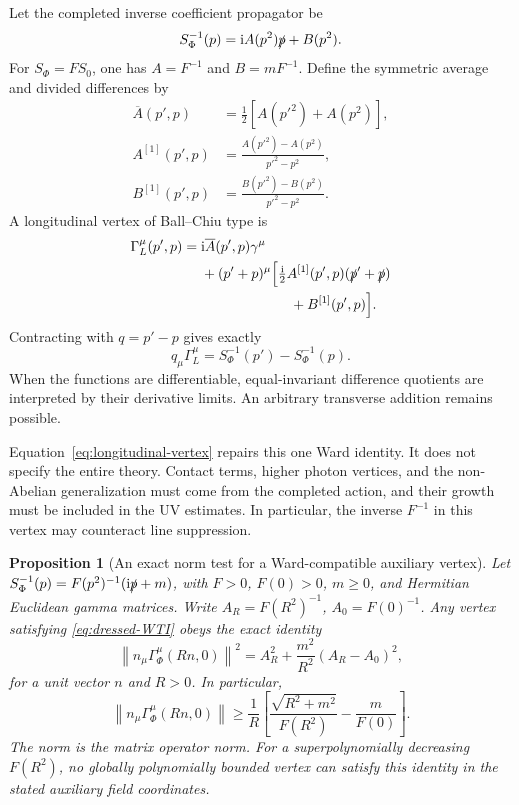\documentclass[final,5p,times,twocolumn,numbers,nopreprintline]{elsarticle}
\numberwithin{equation}{section}
\newtheorem{proposition}[theorem]{Proposition}
\theoremstyle{definition}
\theoremstyle{remark}
\newcommand{\ii}{\mathrm i}
\newcommand{\Ph}{\Phi}
\begin{document}
Let the completed inverse coefficient propagator be
\[
 S_\Ph^{-1}(p)=\ii A(p^2)\slashed p+B(p^2).
\]
For \(S_\Ph=F S_0\), one has \(A=F^{-1}\) and
\(B=mF^{-1}\).
Define the symmetric average and divided differences by
\[
\begin{aligned}
 \overline A(p',p)&=\tfrac12[A(p'^2)+A(p^2)],\\
 A^{[1]}(p',p)&=\frac{A(p'^2)-A(p^2)}{p'^2-p^2},\\
 B^{[1]}(p',p)&=\frac{B(p'^2)-B(p^2)}{p'^2-p^2}.
\end{aligned}
\]
A longitudinal vertex of Ball--Chiu type \cite{BallChiu1980} is
\begin{equation}
\begin{aligned}
 \Gamma_L^\mu(p',p)
 ={}&\ii\overline A(p',p)\gamma^\mu\\
 &+(p'+p)^\mu\Bigl[
     \tfrac{\ii}{2}A^{[1]}(p',p)(\slashed p'+\slashed p)\\
 &\hspace{6.4em}+B^{[1]}(p',p)\Bigr].
\end{aligned}
 \label{eq:longitudinal-vertex}
\end{equation}
Contracting with \(q=p'-p\) gives exactly
\[
 q_\mu\Gamma_L^\mu
       =S_\Ph^{-1}(p')-S_\Ph^{-1}(p).
\]
When the functions are differentiable, equal-invariant difference
quotients are interpreted by their derivative limits.
An arbitrary transverse addition remains possible.

Equation~\eqref{eq:longitudinal-vertex} repairs this one Ward
identity. It does not specify the entire theory. Contact terms,
higher photon vertices, and the non-Abelian generalization must
come from the completed action, and their growth must be included
in the UV estimates. In particular, the inverse \(F^{-1}\) in
this vertex may counteract line suppression.

\begin{proposition}[An exact norm test for a Ward-compatible auxiliary vertex]
\label{prop:Ward-vertex-growth}
Let \(S_\Ph^{-1}(p)=F(p^2)^{-1}(\ii\slashed p+m)\),
with \(F>0\), \(F(0)>0\), \(m\geq0\), and Hermitian Euclidean
gamma matrices. Write \(A_R=F(R^2)^{-1}\), \(A_0=F(0)^{-1}\).
Any vertex satisfying \eqref{eq:dressed-WTI} obeys the exact identity
\begin{equation}
 \left\|n_\mu\Gamma_\Ph^\mu(Rn,0)\right\|^2
       =A_R^2+\frac{m^2}{R^2}(A_R-A_0)^2,
 \label{eq:Ward-vertex-exact-norm}
\end{equation}
for a unit vector \(n\) and \(R>0\). In particular,
\begin{equation}
 \left\|n_\mu\Gamma_\Ph^\mu(Rn,0)\right\|
 \geq\frac1R\left[
       \frac{\sqrt{R^2+m^2}}{F(R^2)}-\frac{m}{F(0)}
                      \right].
 \label{eq:Ward-vertex-growth-lower}
\end{equation}
The norm is the matrix operator norm. For a superpolynomially
decreasing \(F(R^2)\), no globally polynomially bounded vertex
can satisfy this identity in the stated auxiliary field coordinates.
\end{proposition}
\end{document}
